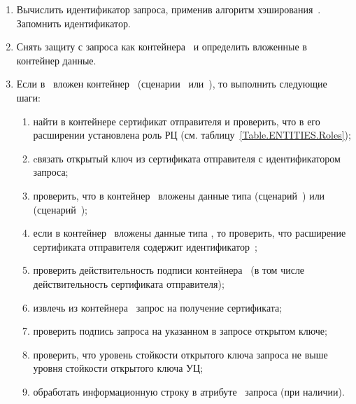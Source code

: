 \begin{enumerate}
\item
Вычислить идентификатор запроса, применив алгоритм хэширования~.
Запомнить идентификатор.

\item
Снять защиту с запроса как контейнера~ и определить
вложенные в контейнер данные.

\item
Если в~ вложен контейнер~
(сценарии~ или~), то выполнить следующие шаги:

\begin{enumerate}
\item
найти в контейнере  сертификат отправителя и проверить, что в
его расширении  установлена роль РЦ (см.
таблицу~\ref{Table.ENTITIES.Roles});
\item
cвязать открытый ключ из сертификата отправителя с идентификатором запроса;
\item                                                    
проверить, что в контейнер~ вложены данные типа
 (сценарий~) или
 (сценарий~);
\item                                                    
если в контейнер~ вложены данные типа
, то проверить, что расширение 
сертификата отправителя содержит идентификатор~;
\item
проверить действительность подписи контейнера~ (в том числе
действительность сертификата отправителя);
\item
извлечь из контейнера~ запрос на получение сертификата;
\item
проверить подпись запроса на указанном в запросе открытом ключе;
\item
проверить, что уровень стойкости открытого ключа запроса не выше уровня стойкости 
открытого ключа УЦ;
\item
обработать информационную строку в атрибуте~ 
запроса (при наличии).
\end{enumerate}


\end{enumerate}

